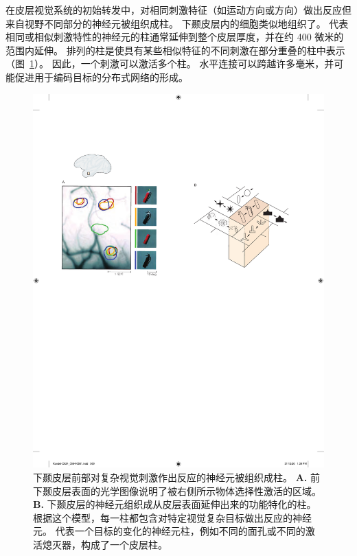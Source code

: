 在皮层视觉系统的初始转发中，对相同刺激特征（如运动方向或方向）做出反应但来自视野不同部分的神经元被组织成柱。
下颞皮层内的细胞类似地组织了。
代表相同或相似刺激特性的神经元的柱通常延伸到整个皮层厚度，并在约 400 微米的范围内延伸。
排列的柱是使具有某些相似特征的不同刺激在部分重叠的柱中表示（图~\ref{fig:24_5}）。
因此，一个刺激可以激活多个柱。
水平连接可以跨越许多毫米，并可能促进用于编码目标的分布式网络的形成。


\begin{figure}[htbp]
	\centering
	\includegraphics[width=1.0\linewidth]{chap24/fig_24_5}
	\caption{下颞皮层前部对复杂视觉刺激作出反应的神经元被组织成柱。
		\textbf{A.} 前下颞皮层表面的光学图像说明了被右侧所示物体选择性激活的区域。
		\textbf{B.} 下颞皮层的神经元组织成从皮层表面延伸出来的功能特化的柱。
		根据这个模型，每一柱都包含对特定视觉复杂目标做出反应的神经元。
		代表一个目标的变化的神经元柱，例如不同的面孔或不同的激活熄灭器，构成了一个皮层柱。}
	\label{fig:24_5}
\end{figure}



